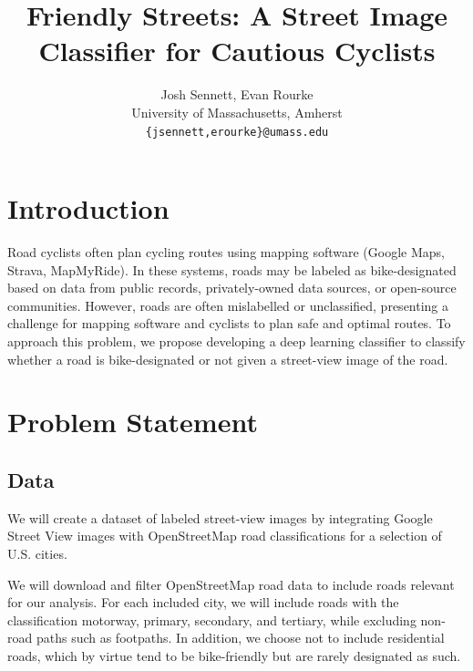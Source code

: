\documentclass[10pt,twocolumn,letterpaper]{article}
\begin{document}
\title{Friendly Streets: A Street Image Classifier for Cautious Cyclists}

\author{Josh Sennett, Evan Rourke\\
University of Massachusetts, Amherst\\
{\tt\small \{jsennett,erourke\}@umass.edu}
}

\maketitle


\section{Introduction}

Road cyclists often plan cycling routes using mapping software (Google Maps, Strava, MapMyRide). In these systems, roads may be labeled as bike-designated based on data from public records, privately-owned data sources, or open-source communities. However, roads are often mislabelled or unclassified, presenting a challenge for mapping software and cyclists to plan safe and optimal routes. To approach this problem, we propose developing a deep learning classifier to classify whether a road is bike-designated or not given a street-view image of the road. 

\section{Problem Statement}

\subsection{Data}

We will create a dataset of labeled street-view images by integrating Google Street View images with OpenStreetMap road classifications for a selection of U.S. cities. 

We will download and filter OpenStreetMap road data to include roads relevant for our analysis. For each included city, we will include roads with the classification motorway, primary, secondary, and tertiary, while excluding non-road paths such as footpaths. In addition, we choose not to include residential roads, which by virtue tend to be bike-friendly but are rarely designated as such.
\end{document}
